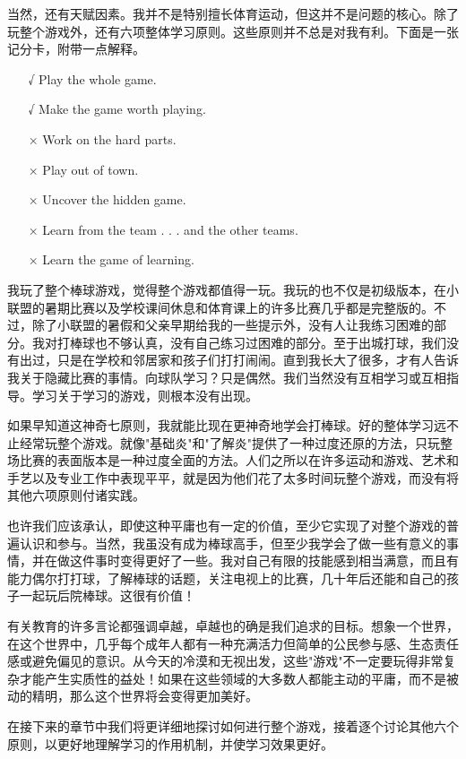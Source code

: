 当然，还有天赋因素。我并不是特别擅长体育运动，但这并不是问题的核心。除了玩整个游戏外，还有六项整体学习原则。这些原则并不总是对我有利。下面是一张记分卡，附带一点解释。
\begin{itemize}
\item[√] Play the whole game.
\item[√] Make the game worth playing.
\item[×] Work on the hard parts.
\item[×] Play out of town.
\item[×] Uncover the hidden game.
\item[×] Learn from the team . . . and the other teams. 
\item[×] Learn the game of learning.
\end{itemize}

我玩了整个棒球游戏，觉得整个游戏都值得一玩。我玩的也不仅是初级版本，在小联盟的暑期比赛以及学校课间休息和体育课上的许多比赛几乎都是完整版的。不过，除了小联盟的暑假和父亲早期给我的一些提示外，没有人让我练习困难的部分。我对打棒球也不够认真，没有自己练习过困难的部分。至于出城打球，我们没有出过，只是在学校和邻居家和孩子们打打闹闹。直到我长大了很多，才有人告诉我关于隐藏比赛的事情。向球队学习？只是偶然。我们当然没有互相学习或互相指导。学习关于学习的游戏，则根本没有出现。

如果早知道这神奇七原则，我就能比现在更神奇地学会打棒球。好的整体学习远不止经常玩整个游戏。就像"基础炎"和"了解炎"提供了一种过度还原的方法，只玩整场比赛的表面版本是一种过度全面的方法。人们之所以在许多运动和游戏、艺术和手艺以及专业工作中表现平平，就是因为他们花了太多时间玩整个游戏，而没有将其他六项原则付诸实践。

也许我们应该承认，即使这种平庸也有一定的价值，至少它实现了对整个游戏的普遍认识和参与。当然，我虽没有成为棒球高手，但至少我学会了做一些有意义的事情，并在做这件事时变得更好了一些。我对自己有限的技能感到相当满意，而且有能力偶尔打打球，了解棒球的话题，关注电视上的比赛，几十年后还能和自己的孩子一起玩后院棒球。这很有价值！

有关教育的许多言论都强调卓越，卓越也的确是我们追求的目标。想象一个世界，在这个世界中，几乎每个成年人都有一种充满活力但简单的公民参与感、生态责任感或避免偏见的意识。从今天的冷漠和无视出发，这些"游戏"不一定要玩得非常复杂才能产生实质性的益处！如果在这些领域的大多数人都能主动的平庸，而不是被动的精明，那么这个世界将会变得更加美好。

在接下来的章节中我们将更详细地探讨如何进行整个游戏，接着逐个讨论其他六个原则，以更好地理解学习的作用机制，并使学习效果更好。